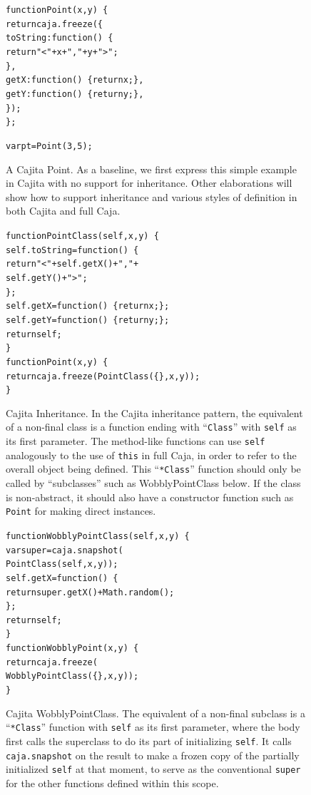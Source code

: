 \documentclass[letterpaper,twocolumn,10pt]{article}
\newcommand{\code}[1]{{\tt {#1}}}              %
\begin{document}
\begin{figure}
\begin{alltt}
function Point(x, y)\ \{
  return caja.freeze(\{
    toString: function()\ \{ 
      return "<" + x + "," + y + ">"; 
    \},
    getX: function()\ \{ return x; \},
    getY: function()\ \{ return y; \},
  \});
\};

var pt = Point(3, 5);
\end{alltt}

\caption[A Cajita Point.]{A Cajita Point. As a baseline, we first express 
this simple example in Cajita with no support for inheritance. Other 
elaborations will show how to support inheritance and various styles of 
definition in both Cajita and full Caja.}
\label{fig:cajita-point}
\end{figure}

\begin{figure}
\begin{alltt}
function PointClass(self, x, y)\ \{
  self.toString = function()\ \{ 
    return "<" + self.getX() + "," + 
                 self.getY() + ">"; 
  \};
  self.getX = function()\ \{ return x; \};
  self.getY = function()\ \{ return y; \};
  return self;
\}
function Point(x, y)\ \{
  return caja.freeze(PointClass(\{\}, x, y));
\}
\end{alltt}

\caption[Cajita Inheritance.]{Cajita Inheritance. In the Cajita inheritance 
pattern, the equivalent of a non-final class is a function ending with 
``\code{Class}'' with \code{self} as its first parameter. The method-like 
functions can use \code{self} analogously to the use of \code{this} in full 
Caja, in order to refer to the overall object being defined. This 
``\code{*Class}'' function should only be called by ``subclasses'' such as 
WobblyPointClass below. If the class is non-abstract, it should also have a 
constructor function such as
\code{Point} for making direct instances.}
\label{fig:cajita-super-point}
\end{figure}

\begin{figure}
\begin{alltt}
function WobblyPointClass(self, x, y)\ \{
  var super = caja.snapshot(
                PointClass(self, x, y));
  self.getX = function()\ \{ 
    return super.getX() + Math.random(); 
  \};
  return self;
\}
function WobblyPoint(x, y)\ \{
  return caja.freeze(
           WobblyPointClass(\{\}, x, y));
\}
\end{alltt}

\caption[Cajita WobblyPointClass.]{Cajita WobblyPointClass. The equivalent of 
a non-final subclass is a ``\code{*Class}'' function with \code{self} as its 
first parameter, where the body first calls the superclass to do its part of 
initializing \code{self}. It calls \code{caja.snapshot} on the result to make 
a frozen copy of the partially initialized \code{self} at that moment, to 
serve as the conventional \code{super} for the other functions defined within 
this scope.}
\label{fig:cajita-super-wobbly-point}
\end{figure}
\end{document}
